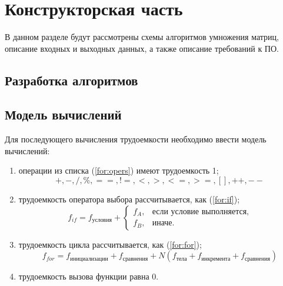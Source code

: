 \chapter{Конструкторская часть}
В данном разделе будут рассмотрены схемы алгоритмов умножения матриц, описание входных и выходных данных, а также описание требований к ПО. 
\section{Разработка алгоритмов}

{}


\clearpage
{}

\section{Модель вычислений}

Для последующего вычисления трудоемкости необходимо ввести модель вычислений:
\begin{enumerate}
    \item операции из списка (\ref{for:opers}) имеют трудоемкость 1;
        \begin{equation}
            \label{for:opers}
            +, -, /, \%, ==, !=, <, >, <=, >=, [], ++, {-}-
        \end{equation}
    \item трудоемкость оператора выбора  рассчитывается, как (\ref{for:if});
	\begin{equation}
        \label{for:if}
        f_{if} = f_{\text{условия}} +
        \begin{cases}
        f_A, & \text{если условие выполняется,}\\
        f_B, & \text{иначе.}
        \end{cases}
	\end{equation}
\item трудоемкость цикла рассчитывается, как (\ref{for:for});
    \begin{equation}
        \label{for:for}
        f_{for} = f_{\text{инициализации}} + f_{\text{сравнения}} + N(f_{\text{тела}} + f_{\text{инкремента}} + f_{\text{сравнения}})
    \end{equation}
	\item трудоемкость вызова функции равна 0.
\end{enumerate}

